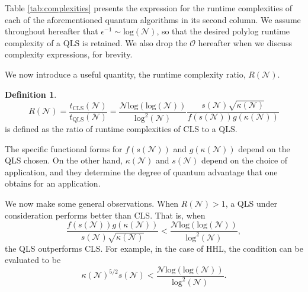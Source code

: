 \documentclass[%
 reprint,
 superscriptaddress,
 amsmath,amssymb,
 aps,
 pra,
floatfix,
nofootinbib,
]{revtex4-2}
\theoremstyle{definition}
\newtheorem{definition}{Definition}[section]
\theoremstyle{remark}
\begin{document}
Table \ref{tab:complexities} presents the expression for the runtime complexities of each of the aforementioned quantum algorithms in its second column. We assume throughout hereafter that $\epsilon^{-1}\sim \mathrm{log}(\mathcal{N})$, so that the desired polylog runtime complexity of a QLS is retained. We also drop the $\mathcal{O}$ hereafter when we discuss complexity expressions, for brevity. 

We now introduce a useful quantity, the runtime complexity ratio, $R(\mathcal{N})$. 

\begin{definition} \label{def:R}
$$R(\mathcal{N})=\frac{t_{\mathrm{CLS}}(\mathcal{N})}{t_{\mathrm{QLS}}(\mathcal{N})}=\frac{\mathcal{N} \mathrm{log}(\mathrm{log}(\mathcal{N}))}{\mathrm{log}^2(\mathcal{N})}\frac{s(\mathcal{N}) \sqrt{\kappa(\mathcal{N})}}{{f}(s(\mathcal{N})){g}(\kappa(\mathcal{N}))}$$ 
is defined as the ratio of runtime complexities of CLS to a QLS. 
\end{definition} 

The specific functional forms for ${f}(s(\mathcal{N}))$ and ${g}(\kappa(\mathcal{N}))$ depend on the QLS chosen. On the other hand, $\kappa(\mathcal{N})$ and $s(\mathcal{N})$ depend on the choice of application, and they determine the degree of quantum advantage that one obtains for an application. 

We now make some general observations. When $R(\mathcal{N})>1$, a QLS under consideration performs better than CLS. That is, when 
$$\frac{f(s(\mathcal{N}))g(\kappa(\mathcal{N}))}{s(\mathcal{N}) \sqrt{\kappa(\mathcal{N})}}<\frac{\mathcal{N} \mathrm{log}(\mathrm{log}(\mathcal{N}))}{\mathrm{log}^2(\mathcal{N})},$$ 
the QLS outperforms CLS. For example, in the case of HHL, the condition can be evaluated to be 
$$\kappa(\mathcal{N})^{5/2} s(\mathcal{N})<\frac{\mathcal{N}\mathrm{log}(\mathrm{log}(\mathcal{N}))}{\mathrm{log}^2(\mathcal{N})}.$$
\end{document}
